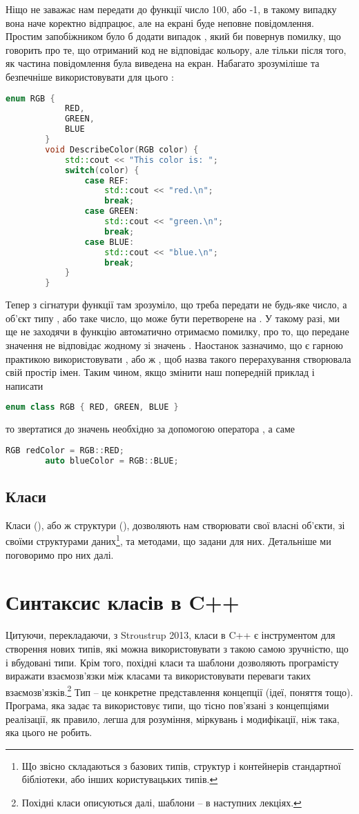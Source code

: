 \documentclass[12pt]{article}
\begin{document}
	Ніщо не заважає нам передати до функції  число 100, або -1, в такому випадку вона наче коректно відпрацює, але на екрані буде неповне повідомлення. Простим запобіжником було б додати випадок , який би повернув помилку, що говорить про те, що отриманий код не відповідає кольору, але тільки після того, як частина повідомлення була виведена на екран. Набагато зрозуміліше та безпечніше використовувати для цього :
	\begin{lstlisting}[language=c++]
		enum RGB {
			RED,
			GREEN,
			BLUE
		}
		void DescribeColor(RGB color) {
			std::cout << "This color is: ";
			switch(color) {
				case REF:
					std::cout << "red.\n";
					break;
				case GREEN:
					std::cout << "green.\n";
					break;
				case BLUE:
					std::cout << "blue.\n";
					break;
			}
		}
	\end{lstlisting}
	Тепер з сігнатури функції там зрозуміло, що треба передати не будь-яке число, а об'єкт типу , або таке число, що може бути перетворене на . У такому разі, ми ще не заходячи в функцію автоматично отримаємо помилку, про то, що передане значення не відповідає жодному зі значень .
	Наостанок зазначимо, що є гарною практикою використовувати , або ж , щоб назва такого перерахування створювала свій простір імен. Таким чином, якщо змінити наш попередній приклад і написати
	\begin{lstlisting}[language=c++]
		enum class RGB { RED, GREEN, BLUE }
	\end{lstlisting}
	то звертатися до значень необхідно за допомогою оператора \m{::}, а саме
	\begin{lstlisting}[language=c++]
		RGB redColor = RGB::RED;
		auto blueColor = RGB::BLUE;
	\end{lstlisting}

	\subsection{Класи}
	Класи (), або ж структури (), дозволяють нам створювати свої власні об'єкти, зі своїми структурами даних\footnote{Що звісно складаються з базових типів, структур і контейнерів стандартної бібліотеки, або інших користувацьких типів.}, та методами, що задани для них. Детальніше ми поговоримо про них далі.

	\section{Синтаксис класів в C++}
	Цитуючи, перекладаючи, з Stroustrup 2013, класи в C++ є інструментом для створення нових типів, які можна використовувати з такою самою зручністю, що і вбудовані типи. Крім того, похідні класи та шаблони дозволяють програмісту виражати взаємозв'язки між класами та використовувати переваги таких взаємозв'язків.\footnote{Похідні класи описуються далі, шаблони -- в наступних лекціях.} Тип -- це конкретне представлення концепції (ідеї, поняття тощо). Програма, яка задає та використовує типи, що тісно пов'язані з концепціями реалізації, як правило, легша для розуміння, міркувань і модифікації, ніж така, яка цього не робить.
\end{document}
